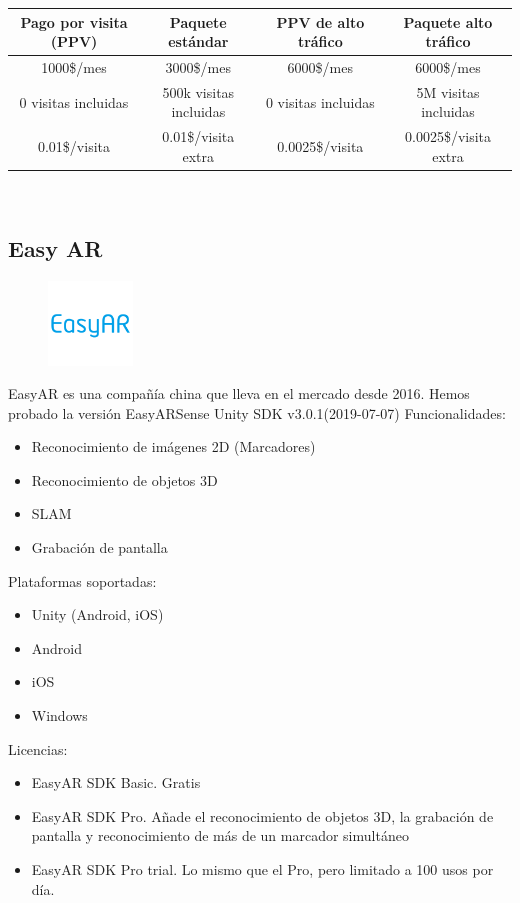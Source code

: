 \begin{center}
\begin{tabular}{| c| c |c| c |}
\hline
 Pago por visita (PPV)&	Paquete estándar&PPV de alto tráfico&Paquete alto tráfico \\
 \hline
  1000\$/mes	& 3000\$/mes	& 6000\$/mes &	6000\$/mes \\  
  \hline
 0 visitas incluidas &	500k visitas incluidas&	0 visitas incluidas	&5M visitas incluidas\\
 \hline
 0.01\$/visita&	0.01\$/visita extra&	0.0025\$/visita&	0.0025\$/visita extra\\
 \hline
\end{tabular}
\caption{Licencias 8th Wall}
\end{center}
\\

\clearpage
\subsection{Easy AR}
\begin{figure}[H]
    \centering
    \includegraphics[width=0.2\textwidth]{Images/EasyAR.png}
    \label{fig:my_label}
\end{figure}

EasyAR es una compañía china que lleva en el mercado desde 2016. Hemos probado la versión EasyARSense Unity SDK v3.0.1(2019-07-07)\cite{EasyAR}
Funcionalidades:
\begin{itemize}
\item Reconocimiento de imágenes 2D (Marcadores)
\item Reconocimiento de objetos 3D
\item SLAM
\item Grabación de pantalla
\end{itemize}
Plataformas soportadas:
\begin{itemize}
\item Unity (Android, iOS)
\item Android
\item iOS
\item Windows
\end{itemize}
Licencias:
\begin{itemize}
\item EasyAR SDK Basic. Gratis
\item EasyAR SDK Pro. Añade el reconocimiento de objetos 3D, la grabación de pantalla y reconocimiento de más de un marcador simultáneo
\item EasyAR SDK Pro trial. Lo mismo que el Pro, pero limitado a 100 usos por día.
\end{itemize}

